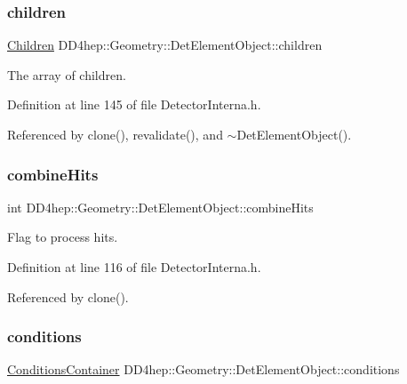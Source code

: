 \subsubsection{\texorpdfstring{children}{children}}
{\footnotesize\ttfamily \hyperlink{class_d_d4hep_1_1_geometry_1_1_det_element_object_aaf04a1f51d7a7ce4c0e0dc4863268d8a}{Children} D\+D4hep\+::\+Geometry\+::\+Det\+Element\+Object\+::children}



The array of children. 



Definition at line 145 of file Detector\+Interna.\+h.



Referenced by clone(), revalidate(), and $\sim$\+Det\+Element\+Object().

\hypertarget{class_d_d4hep_1_1_geometry_1_1_det_element_object_a36e650a06cc4b82337bc3354bd38402a}{}\label{class_d_d4hep_1_1_geometry_1_1_det_element_object_a36e650a06cc4b82337bc3354bd38402a} 
\subsubsection{\texorpdfstring{combine\+Hits}{combineHits}}
{\footnotesize\ttfamily int D\+D4hep\+::\+Geometry\+::\+Det\+Element\+Object\+::combine\+Hits}



Flag to process hits. 



Definition at line 116 of file Detector\+Interna.\+h.



Referenced by clone().

\hypertarget{class_d_d4hep_1_1_geometry_1_1_det_element_object_a80cf81ef1cd6f9f3d29865dee64ceaca}{}\label{class_d_d4hep_1_1_geometry_1_1_det_element_object_a80cf81ef1cd6f9f3d29865dee64ceaca} 
\subsubsection{\texorpdfstring{conditions}{conditions}}
{\footnotesize\ttfamily \hyperlink{class_d_d4hep_1_1_geometry_1_1_det_element_object_a01728952c7dd2f2c102e2a1ae25b80ff}{Conditions\+Container} D\+D4hep\+::\+Geometry\+::\+Det\+Element\+Object\+::conditions}



